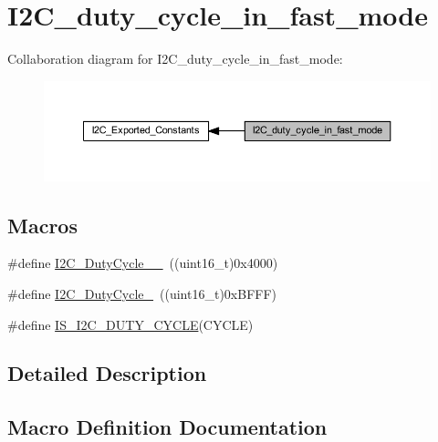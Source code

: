 \hypertarget{group___i2_c__duty__cycle__in__fast__mode}{}\section{I2\+C\+\_\+duty\+\_\+cycle\+\_\+in\+\_\+fast\+\_\+mode}
\label{group___i2_c__duty__cycle__in__fast__mode}
Collaboration diagram for I2\+C\+\_\+duty\+\_\+cycle\+\_\+in\+\_\+fast\+\_\+mode\+:
\nopagebreak
\begin{figure}[H]
\begin{center}
\leavevmode
\includegraphics[width=350pt]{group___i2_c__duty__cycle__in__fast__mode}
\end{center}
\end{figure}
\subsection*{Macros}
\begin{DoxyCompactItemize}
\item 
\#define \hyperlink{group___i2_c__duty__cycle__in__fast__mode_ga2b4ff186808a8095fc2d1b8193f30ce1}{I2\+C\+\_\+\+Duty\+Cycle\+\_\+\_}~((uint16\+\_\+t)0x4000)
\item 
\#define \hyperlink{group___i2_c__duty__cycle__in__fast__mode_gafe0af31970aceef0fa8df6a10bef35db}{I2\+C\+\_\+\+Duty\+Cycle\+\_}~((uint16\+\_\+t)0x\+B\+F\+F\+F)
\item 
\#define \hyperlink{group___i2_c__duty__cycle__in__fast__mode_gae9b3276d9b6ec872ee4fafa2b2fafb83}{I\+S\+\_\+\+I2\+C\+\_\+\+D\+U\+T\+Y\+\_\+\+C\+Y\+C\+LE}(C\+Y\+C\+LE)
\end{DoxyCompactItemize}


\subsection{Detailed Description}


\subsection{Macro Definition Documentation}
\mbox{\label{group___i2_c__duty__cycle__in__fast__mode_ga2b4ff186808a8095fc2d1b8193f30ce1}} 
